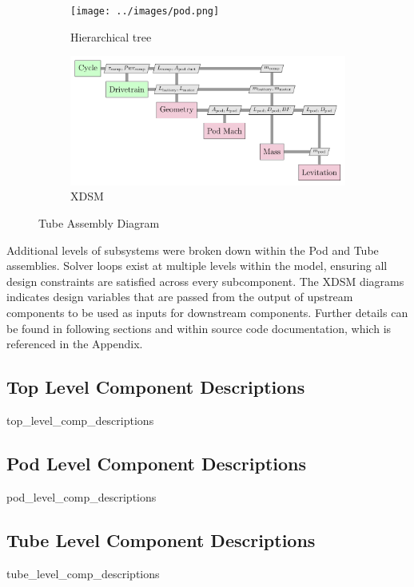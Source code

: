 \begin{figure}
\centering
\begin{subfigure}[t]{.5\textwidth}
  \centering
  \texttt{[image: ../images/pod.png]}
  \caption{Hierarchical tree}
  \label{fig:tree:pod}
\end{subfigure}%
\begin{subfigure}[t]{.5\textwidth}
  \centering
  \includegraphics{../images/xdsm/pod.pdf}
  \caption{XDSM}
  \label{fig:xdsm:pod}
\end{subfigure}
\caption{Tube Assembly Diagram}
\label{fig:pod}
\end{figure}

Additional levels of subsystems were broken down within the Pod and Tube assemblies.
Solver loops exist at multiple levels within the model, ensuring all design
constraints are satisfied across every subcomponent.
The XDSM diagrams indicates design variables that are passed from the output of
upstream components to be used as inputs for downstream components.
Further details can be found in following sections and within source code
documentation, which is referenced in the Appendix.

\subsection{Top Level Component Descriptions}
	{top_level_comp_descriptions}
\subsection{Pod Level Component Descriptions}
	{pod_level_comp_descriptions}
\subsection{Tube Level Component Descriptions}
	{tube_level_comp_descriptions}


